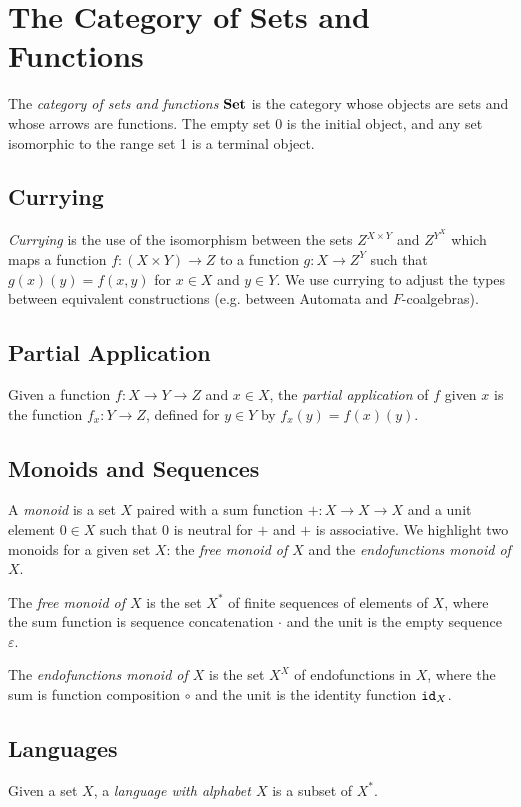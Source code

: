 \section{The Category of Sets and Functions}
The \emph{category of sets and functions} $\AsCategory{Set}$ is the category whose objects are sets and whose arrows are functions. The empty set $0$ is the initial object, and any set isomorphic to the range set 1 is a terminal object.

\subsection{Currying}
\emph{Currying} is the use of the isomorphism between the sets $Z^{X\times Y}$ and $Z^{Y^X}$ which maps a function $f\colon (X\times Y)\rightarrow Z$ to a function $g\colon X\rightarrow Z^Y$ such that $g(x)(y)=f(x,y)$ for $x\in X$ and $y\in Y$. We use currying to adjust the types between equivalent constructions (e.g. between Automata and $F$-coalgebras).

\subsection{Partial Application}
Given a function $f\colon X\rightarrow Y \rightarrow Z$ and $x\in X$, the \emph{partial application} of $f$ given $x$ is the function $f_x\colon Y \rightarrow Z$, defined for $y\in Y$ by $f_x(y)=f(x)(y)$.

\subsection{Monoids and Sequences} 
A \emph{monoid} is a set $X$ paired with a sum function $+\colon X\rightarrow X\rightarrow X$ and a unit element $0\in X$ such that $0$ is neutral for $+$ and $+$ is associative. We highlight two monoids for a given set $X$: the \emph{free monoid of $X$} and the \emph{endofunctions monoid of $X$}.

The \emph{free monoid of $X$} is the set $X^*$ of finite sequences of elements of $X$, where the sum function is sequence concatenation $\cdot$ and the unit is the empty sequence $\varepsilon$. 

The \emph{endofunctions monoid of $X$} is the set $X^X$ of endofunctions in $X$, where the sum is function composition $\circ$ and the unit is the identity function ${\texttt{id}}_X$.

\subsection{Languages}
Given a set $X$, a \emph{language with alphabet $X$} is a subset of $X^*$. 

